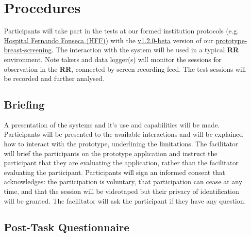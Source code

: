 \section{Procedures}

Participants will take part in the tests at our formed institution protocols (e.g. \hyperlink{http://hff.min-saude.pt/}{Hospital Fernando Fonseca (HFF)}) with the \hyperlink{https://github.com/MIMBCD-UI/prototype-breast-screening/releases/tag/v1.2.0-beta}{v1.2.0-beta} version of our \hyperlink{https://github.com/MIMBCD-UI/prototype-breast-screening/}{prototype-breast-screening}. The interaction with the system will be used in a typical \textbf{RR} environment. Note takers and data logger(s) will monitor the sessions for observation in the \textbf{RR}, connected by screen recording feed. The test sessions will be recorded and further analysed.


\subsection{Briefing}

A presentation of the systems and it's use and capabilities will be made. Participants will be presented to the available interactions and will be explained how to interact with the prototype, underlining the limitations. The facilitator will brief the participants on the prototype application and instruct the participant that they are evaluating the application, rather than the facilitator evaluating the participant. Participants will sign an informed consent that acknowledges: the participation is voluntary, that participation can cease at any time, and that the session will be videotaped but their privacy of identification will be granted. The facilitator will ask the participant if they have any question.



\subsection{Post-Task Questionnaire}

